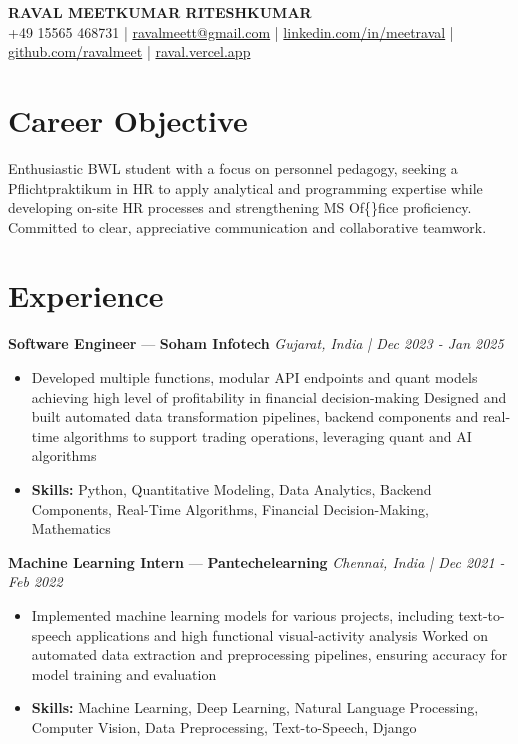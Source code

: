 \documentclass[a4paper,10pt]{article}
\begin{document}
\begin{center}
  {\Large\bfseries RAVAL MEETKUMAR RITESHKUMAR}\\[2pt]
  {\small +49 15565 468731 \;|\; \href{mailto:ravalmeett@gmail.com}{ravalmeett@gmail.com} \;|\; \href{https://www.linkedin.com/in/meetraval/}{linkedin.com/in/meetraval} \;|\; \href{https://github.com/ravalmeet}{github.com/ravalmeet} \;|\; \href{https://raval.vercel.app/}{raval.vercel.app}}
\end{center}
\vspace{-3pt}

\section*{Career Objective}
Enthusiastic BWL student with a focus on personnel pedagogy, seeking a Pflichtpraktikum in HR to apply analytical and programming expertise while developing on-site HR processes and strengthening MS Of\{\}fice proficiency. Committed to clear, appreciative communication and collaborative teamwork.\par

\section*{Experience}
\textbf{Software Engineer} — \textbf{Soham Infotech} \hfill \textit{Gujarat, India \;|\; Dec 2023 - Jan 2025}\par
\vspace{1pt}
\begin{itemize}
  \item Developed multiple functions, modular API endpoints and quant models achieving high level of profitability in financial decision-making Designed and built automated data transformation pipelines, backend components and real-time algorithms to support trading operations, leveraging quant and AI algorithms
  \item \textbf{Skills:} Python, Quantitative Modeling, Data Analytics, Backend Components, Real-Time Algorithms, Financial Decision-Making, Mathematics
\end{itemize}
\vspace{3pt}
\textbf{Machine Learning Intern} — \textbf{Pantechelearning} \hfill \textit{Chennai, India \;|\; Dec 2021 - Feb 2022}\par
\vspace{1pt}
\begin{itemize}
  \item Implemented machine learning models for various projects, including text-to-speech applications and high functional visual-activity analysis Worked on automated data extraction and preprocessing pipelines, ensuring accuracy for model training and evaluation
  \item \textbf{Skills:} Machine Learning, Deep Learning, Natural Language Processing, Computer Vision, Data Preprocessing, Text-to-Speech, Django
\end{itemize}
\end{document}
